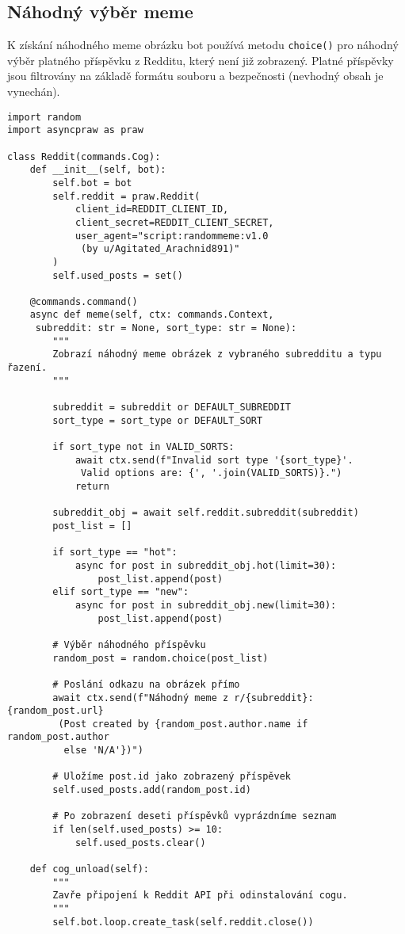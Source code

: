 \documentclass[12pt, a4paper]{report}
\begin{document}
\subsection{Náhodný výběr meme}
K získání náhodného meme obrázku bot používá metodu \texttt{choice()} pro náhodný výběr platného příspěvku z Redditu, který není již zobrazený. Platné příspěvky jsou filtrovány na základě formátu souboru a bezpečnosti (nevhodný obsah je vynechán).
\vspace{\baselineskip}
\begin{lstlisting}[style=Python, caption=Zobrazení náhodného meme z Redditu]
import random
import asyncpraw as praw

class Reddit(commands.Cog):
    def __init__(self, bot):
        self.bot = bot
        self.reddit = praw.Reddit(
            client_id=REDDIT_CLIENT_ID,
            client_secret=REDDIT_CLIENT_SECRET,
            user_agent="script:randommeme:v1.0
             (by u/Agitated_Arachnid891)"
        )
        self.used_posts = set()

    @commands.command()
    async def meme(self, ctx: commands.Context,
     subreddit: str = None, sort_type: str = None):
        """
        Zobrazí náhodný meme obrázek z vybraného subredditu a typu řazení.
        """

        subreddit = subreddit or DEFAULT_SUBREDDIT
        sort_type = sort_type or DEFAULT_SORT

        if sort_type not in VALID_SORTS:
            await ctx.send(f"Invalid sort type '{sort_type}'.
             Valid options are: {', '.join(VALID_SORTS)}.")
            return

        subreddit_obj = await self.reddit.subreddit(subreddit)
        post_list = []

        if sort_type == "hot":
            async for post in subreddit_obj.hot(limit=30):
                post_list.append(post)
        elif sort_type == "new":
            async for post in subreddit_obj.new(limit=30):
                post_list.append(post)

        # Výběr náhodného příspěvku
        random_post = random.choice(post_list)

        # Poslání odkazu na obrázek přímo
        await ctx.send(f"Náhodný meme z r/{subreddit}: {random_post.url}
         (Post created by {random_post.author.name if random_post.author
          else 'N/A'})")

        # Uložíme post.id jako zobrazený příspěvek
        self.used_posts.add(random_post.id)

        # Po zobrazení deseti příspěvků vyprázdníme seznam
        if len(self.used_posts) >= 10:
            self.used_posts.clear()

    def cog_unload(self):
        """
        Zavře připojení k Reddit API při odinstalování cogu.
        """
        self.bot.loop.create_task(self.reddit.close())
\end{lstlisting}
\end{document}
